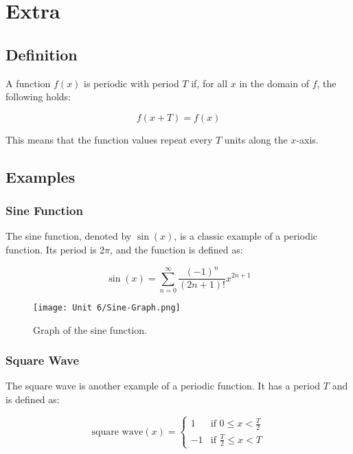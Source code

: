 \documentclass[12pt,a4paper]{article}
\begin{document}
\newpage
\section*{Extra}
\subsection*{Definition}

A function $f(x)$ is periodic with period $T$ if, for all $x$ in the domain of $f$, the following holds:

\[
f(x + T) = f(x)
\]

This means that the function values repeat every $T$ units along the $x$-axis.

\subsection*{Examples}

\subsubsection*{Sine Function}

\begin{tcolorbox}[mybox]
    The sine function, denoted by $\sin(x)$, is a classic example of a periodic function. Its period is $2\pi$, and the function is defined as:
    
    \[
    \sin(x) = \sum_{n=0}^{\infty} \frac{(-1)^n}{(2n+1)!} x^{2n+1}
    \]
\end{tcolorbox}

\begin{figure}[h]
    \centering
    \texttt{[image: Unit 6/Sine-Graph.png]}
    \caption{Graph of the sine function.}
\end{figure}
\newpage 
\subsubsection*{Square Wave}

\begin{tcolorbox}[mybox]
    The square wave is another example of a periodic function. It has a period $T$ and is defined as:
    
    \[
    \text{square wave}(x) = 
    \begin{cases} 
    1 & \text{if } 0 \leq x < \frac{T}{2} \\
    -1 & \text{if } \frac{T}{2} \leq x < T
    \end{cases}
    \]
\end{tcolorbox}
\end{document}
